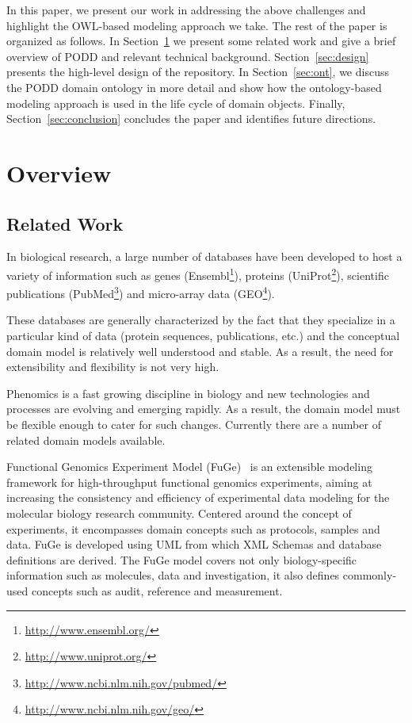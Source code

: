 \documentclass{llncs}
\begin{document}
In this paper, we present our work in addressing the above
challenges and highlight the OWL-based modeling approach we take.
The rest of the paper is organized as follows. In
Section~\ref{sec:overview} we present some related work and give a
brief overview of PODD and relevant technical background.
Section~\ref{sec:design} presents the high-level design of the
repository. In Section~\ref{sec:ont}, we discuss the PODD domain
ontology in more detail and show how the ontology-based modeling
approach is used in the life cycle of domain objects. Finally,
Section~\ref{sec:conclusion} concludes the paper and identifies
future directions.

\section{Overview}\label{sec:overview}
\subsection{Related Work}
In biological research, a large number of databases have been
developed to host a variety of information such as genes
(Ensembl\footnote{\url{http://www.ensembl.org/}}), proteins
(UniProt\footnote{\url{http://www.uniprot.org/}}), scientific
publications
(PubMed\footnote{\url{http://www.ncbi.nlm.nih.gov/pubmed/}}) and
micro-array data
(GEO\footnote{\url{http://www.ncbi.nlm.nih.gov/geo/}}).

These databases are generally characterized by the fact that they
specialize in a particular kind of data (protein sequences,
publications, etc.) and the conceptual domain model is relatively
well understood and stable. As a result, the need for extensibility
and flexibility is not very high.

Phenomics is a fast growing discipline in biology and new
technologies and processes are evolving and emerging rapidly. As a
result, the domain model must be flexible enough to cater for such
changes. Currently there are a number of related domain models
available.

Functional Genomics Experiment Model (FuGe)~\cite{citeulike:1756058}
is an extensible modeling framework for high-throughput functional
genomics experiments, aiming at increasing the consistency and
efficiency of experimental data modeling for the molecular biology
research community. Centered around the concept of experiments, it
encompasses domain concepts such as protocols, samples and data.
FuGe is developed using UML from which XML Schemas and database
definitions are derived. The FuGe model covers not only
biology-specific information such as molecules, data and
investigation, it also defines commonly-used concepts such as audit,
reference and measurement.
\end{document}
